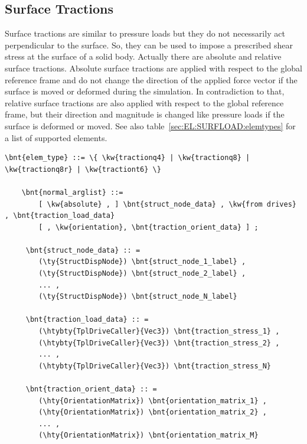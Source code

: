 \subsection{Surface Tractions}
Surface tractions are similar to pressure loads but they do not necessarily act perpendicular to the surface.
So, they can be used to impose a prescribed shear stress at the surface of a solid body.
Actually there are absolute and relative surface tractions. Absolute surface tractions are applied with respect
to the global reference frame and do not change the direction of the applied force vector if the surface is moved
or deformed during the simulation. In contradiction to that, relative surface tractions are also applied with respect
to the global reference frame, but their direction and magnitude is changed like pressure loads if the surface is deformed or moved.
See also table~\ref{sec:EL:SURFLOAD:elemtypes} for a list of supported elements.
\begin{Verbatim}[commandchars=\\\{\}]
  \bnt{elem_type} ::= \{ \kw{tractionq4} | \kw{tractionq8} | \kw{tractionq8r} | \kw{tractiont6} \}

    \bnt{normal_arglist} ::=
        [ \kw{absolute} , ] \bnt{struct_node_data} , \kw{from drives} , \bnt{traction_load_data}
        [ , \kw{orientation}, \bnt{traction_orient_data} ] ;

     \bnt{struct_node_data} :: =
        (\ty{StructDispNode}) \bnt{struct_node_1_label} ,
        (\ty{StructDispNode}) \bnt{struct_node_2_label} ,
        ... ,
        (\ty{StructDispNode}) \bnt{struct_node_N_label}

     \bnt{traction_load_data} :: =
        (\htybty{TplDriveCaller}{Vec3}) \bnt{traction_stress_1} ,
        (\htybty{TplDriveCaller}{Vec3}) \bnt{traction_stress_2} ,
        ... ,
        (\htybty{TplDriveCaller}{Vec3}) \bnt{traction_stress_N}

     \bnt{traction_orient_data} :: =
        (\hty{OrientationMatrix}) \bnt{orientation_matrix_1} ,
        (\hty{OrientationMatrix}) \bnt{orientation_matrix_2} ,
        ... ,
        (\hty{OrientationMatrix}) \bnt{orientation_matrix_M}
\end{Verbatim}

